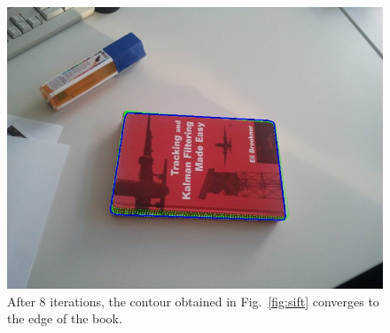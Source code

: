 \begin{figure}[htbp]
  \centering
\includegraphics[width=\linewidth]{images/sift_result.jpg}
\caption[The contour obtained using the CCD algorithm converges to the
edge of the book]{After 8 iterations, the contour obtained in Fig.~\ref{fig:sift} converges to the edge of the book.}
\label{fig:sift_result}
\end{figure}


